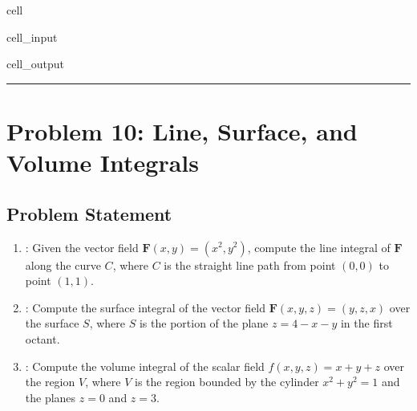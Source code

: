 \documentclass[letterpaper,10pt,english]{jupyterBook}
\begin{document}
\begin{sphinxuseclass}{cell}
\begin{sphinxVerbatimInput}
\begin{sphinxuseclass}{cell_input}
\end{sphinxuseclass}\end{sphinxVerbatimInput}
\begin{sphinxVerbatimOutput}

\begin{sphinxuseclass}{cell_output}
\noindent{}

\end{sphinxuseclass}\end{sphinxVerbatimOutput}

\end{sphinxuseclass}

\bigskip\hrule\bigskip



\section{Problem 10: Line, Surface, and Volume Integrals}
\label{\detokenize{prerequisites:problem-10-line-surface-and-volume-integrals}}

\subsection{Problem Statement}
\label{\detokenize{prerequisites:id11}}\begin{enumerate}
%
\item {} 
\sphinxAtStartPar
{}: Given the vector field \(\mathbf{F}(x, y) = (x^2, y^2)\), compute the line integral of \(\mathbf{F} \) along the curve \(C\), where \(C\) is the straight line path from point \((0, 0)\) to point \((1, 1)\).

\item {} 
\sphinxAtStartPar
{}: Compute the surface integral of the vector field \(\mathbf{F}(x, y, z) = (y, z, x)\) over the surface \(S\), where \(S\) is the portion of the plane \(z = 4 - x - y\) in the first octant.

\item {} 
\sphinxAtStartPar
{}: Compute the volume integral of the scalar field \(f(x, y, z) = x + y + z\) over the region \(V\), where \(V\) is the region bounded by the cylinder \(x^2 + y^2 = 1\) and the planes \(z = 0\) and \(z = 3\).

\end{enumerate}
\end{document}
